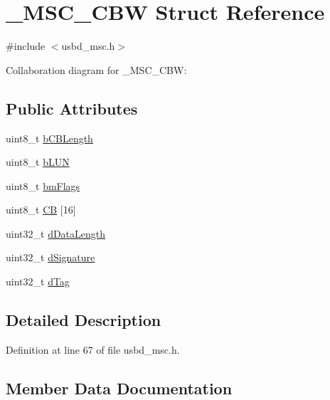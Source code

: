 \hypertarget{struct__MSC__CBW}{}\section{\+\_\+\+M\+S\+C\+\_\+\+C\+BW Struct Reference}
\label{struct__MSC__CBW}


{\ttfamily \#include $<$usbd\+\_\+msc.\+h$>$}



Collaboration diagram for \+\_\+\+M\+S\+C\+\_\+\+C\+BW\+:
\subsection*{Public Attributes}
\begin{DoxyCompactItemize}
\item 
uint8\+\_\+t \hyperlink{struct__MSC__CBW_a2b867486ab4560cb4a6af62289415400}{b\+C\+B\+Length}
\item 
uint8\+\_\+t \hyperlink{struct__MSC__CBW_aa6b62e68b9e2b63792ab904e2f090107}{b\+L\+UN}
\item 
uint8\+\_\+t \hyperlink{struct__MSC__CBW_a57c100a025722a6f5a30c49035e5a23f}{bm\+Flags}
\item 
uint8\+\_\+t \hyperlink{struct__MSC__CBW_a9a89704eaaa2b7079085ecd40a908fe7}{CB} \mbox{[}16\mbox{]}
\item 
uint32\+\_\+t \hyperlink{struct__MSC__CBW_af35538f5f1b08d48b3f11f5cb3c858ca}{d\+Data\+Length}
\item 
uint32\+\_\+t \hyperlink{struct__MSC__CBW_a1fa625c9bfe68afb30fe973585627c38}{d\+Signature}
\item 
uint32\+\_\+t \hyperlink{struct__MSC__CBW_a2bc3d8d87456e730b569f155a013fbda}{d\+Tag}
\end{DoxyCompactItemize}


\subsection{Detailed Description}


Definition at line 67 of file usbd\+\_\+msc.\+h.



\subsection{Member Data Documentation}
